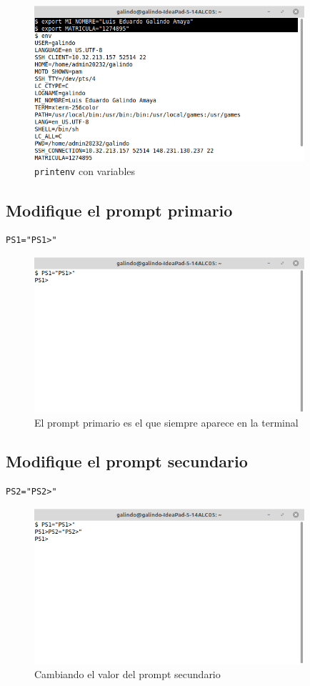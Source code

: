 \documentclass[11pt]{article}
\begin{document}
\begin{figure}[htbp]
\centering
\includegraphics[width=10cm]{img/6.png}
\caption[\texttt{printenv}]{\texttt{printenv} con variables}
\end{figure}

\subsection{Modifique el prompt primario}
\label{sec:org0bd5bb3}
\begin{verbatim}
PS1="PS1>"
\end{verbatim}

\begin{figure}[htbp]
\centering
\includegraphics[width=10cm]{img/7.png}
\caption{El prompt primario es el que siempre aparece en la terminal}
\end{figure}

\pagebreak

\subsection{Modifique el prompt secundario}
\label{sec:org98e3d4d}
\begin{verbatim}
PS2="PS2>"
\end{verbatim}

\begin{figure}[htbp]
\centering
\includegraphics[width=10cm]{img/8a.png}
\caption{Cambiando el valor del prompt secundario}
\end{figure}
\end{document}
